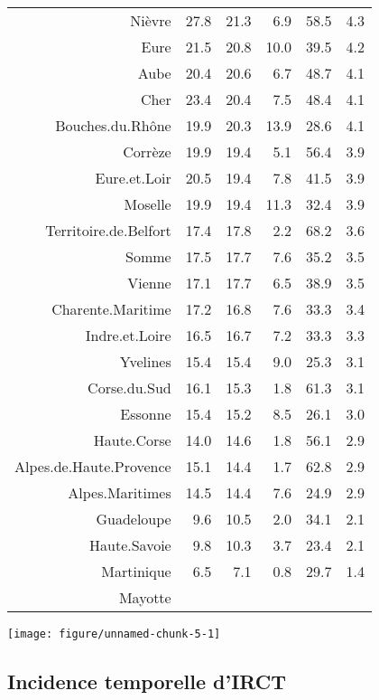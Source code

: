 \documentclass[11pt,a4paper]{article}\usepackage[]{graphicx}\usepackage[]{color}
\makeatletter
\def\maxwidth{ %
  \ifdim\Gin@nat@width>\linewidth
    \linewidth
  \else
    \Gin@nat@width
  \fi
}
\newenvironment{knitrout}{}{} %
\makeatother
\begin{document}
\begin{table}[H]
\begin{tabular}{rrrrrr}
  Nièvre & 27.8 & 21.3 & 6.9 & 58.5 & 4.3 \\ 
  Eure & 21.5 & 20.8 & 10.0 & 39.5 & 4.2 \\ 
  Aube & 20.4 & 20.6 & 6.7 & 48.7 & 4.1 \\ 
  Cher & 23.4 & 20.4 & 7.5 & 48.4 & 4.1 \\ 
  Bouches.du.Rhône & 19.9 & 20.3 & 13.9 & 28.6 & 4.1 \\ 
  Corrèze & 19.9 & 19.4 & 5.1 & 56.4 & 3.9 \\ 
  Eure.et.Loir & 20.5 & 19.4 & 7.8 & 41.5 & 3.9 \\ 
  Moselle & 19.9 & 19.4 & 11.3 & 32.4 & 3.9 \\ 
  Territoire.de.Belfort & 17.4 & 17.8 & 2.2 & 68.2 & 3.6 \\ 
  Somme & 17.5 & 17.7 & 7.6 & 35.2 & 3.5 \\ 
  Vienne & 17.1 & 17.7 & 6.5 & 38.9 & 3.5 \\ 
  Charente.Maritime & 17.2 & 16.8 & 7.6 & 33.3 & 3.4 \\ 
  Indre.et.Loire & 16.5 & 16.7 & 7.2 & 33.3 & 3.3 \\ 
  Yvelines & 15.4 & 15.4 & 9.0 & 25.3 & 3.1 \\ 
  Corse.du.Sud & 16.1 & 15.3 & 1.8 & 61.3 & 3.1 \\ 
  Essonne & 15.4 & 15.2 & 8.5 & 26.1 & 3.0 \\ 
  Haute.Corse & 14.0 & 14.6 & 1.8 & 56.1 & 2.9 \\ 
  Alpes.de.Haute.Provence & 15.1 & 14.4 & 1.7 & 62.8 & 2.9 \\ 
  Alpes.Maritimes & 14.5 & 14.4 & 7.6 & 24.9 & 2.9 \\ 
  Guadeloupe & 9.6 & 10.5 & 2.0 & 34.1 & 2.1 \\ 
  Haute.Savoie & 9.8 & 10.3 & 3.7 & 23.4 & 2.1 \\ 
  Martinique & 6.5 & 7.1 & 0.8 & 29.7 & 1.4 \\ 
  Mayotte &  &  &  &  &  \\ 
   \hline
\end{tabular}
\end{table}



\begin{knitrout}
\color{fgcolor}
\texttt{[image: figure/unnamed-chunk-5-1]} 

\end{knitrout}

  \subsection{Incidence temporelle d'IRCT}
\end{document}
